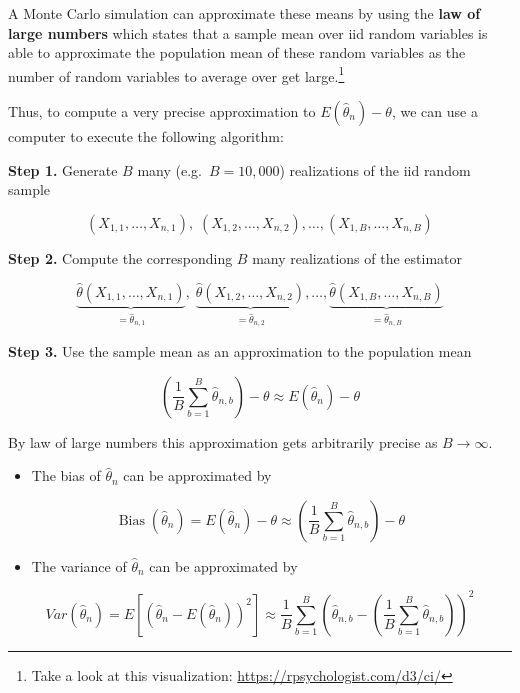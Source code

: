 \documentclass[
  letterpaper,
  DIV=11,
  numbers=noendperiod]{scrreprt}
\providecommand{\tightlist}{%
  \setlength{\itemsep}{0pt}\setlength{\parskip}{0pt}}\usepackage{longtable,booktabs,array}
\theoremstyle{definition}
\theoremstyle{plain}
\theoremstyle{plain}
\theoremstyle{remark}
\begin{document}
A Monte Carlo simulation can approximate these means by using the
\textbf{law of large numbers} which states that a sample mean over iid
random variables is able to approximate the population mean of these
random variables as the number of random variables to average over get
large.\footnote{Take a look at this visualization:
  \url{https://rpsychologist.com/d3/ci/}}

Thus, to compute a very precise approximation to
\(E\left(\hat\theta_n\right)-\theta\), we can use a computer to execute
the following algorithm:

\textbf{Step 1.} Generate \(B\) many (e.g.~\(B=10,000\)) realizations of
the iid random sample

\[
(X_{1,1},\dots,X_{n,1}),\; (X_{1,2},\dots,X_{n,2}),\dots, (X_{1,B},\dots,X_{n,B})
\]

\textbf{Step 2.} Compute the corresponding \(B\) many realizations of
the estimator

\[
\underbrace{\hat\theta(X_{1,1},\dots,X_{n,1})}_{=\hat\theta_{n,1}},\;\underbrace{\hat\theta(X_{1,2},\dots,X_{n,2})}_{=\hat\theta_{n,2}},\dots,\underbrace{\hat\theta(X_{1,B},\dots,X_{n,B})}_{=\hat\theta_{n,B}}
\]

\textbf{Step 3.} Use the sample mean as an approximation to the
population mean

\[
\left(\frac{1}{B}\sum_{b=1}^B \hat\theta_{n,b}\right) - \theta \approx E\left(\hat\theta_n\right)-\theta
\]

By law of large numbers this approximation gets arbitrarily precise as
\(B \to \infty\).

\begin{itemize}
\tightlist
\item
  The bias of \(\hat\theta_n\) can be approximated by
\end{itemize}

\[
\operatorname{Bias}\left(\hat\theta_n\right)=E\left(\hat\theta_n\right)-\theta\approx\left(\frac{1}{B}\sum_{b=1}^B \hat\theta_{n,b}\right) - \theta
\]

\begin{itemize}
\tightlist
\item
  The variance of \(\hat\theta_n\) can be approximated by
\end{itemize}

\[
Var\left(\hat\theta_n\right)=E\left[\left(\hat\theta_n - E(\hat\theta_n)\right)^2\right]\approx \frac{1}{B}\sum_{b=1}^B \left(\hat\theta_{n,b} - \left(\frac{1}{B}\sum_{b=1}^B \hat\theta_{n,b}\right)\right)^2
\]
\end{document}
